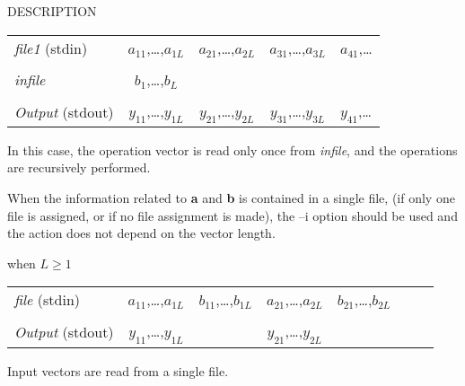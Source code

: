 \begin{qsection}{DESCRIPTION}
\begin{description}
\begin{tabular}{l|c|c|c|l} \cline{2-5}
{\em file1} (stdin)     & {$a_{11}$,\dots,$a_{1L}$}
                        & {$a_{21}$,\dots,$a_{2L}$}
                        & {$a_{31}$,\dots,$a_{3L}$}
                        & {$a_{41}$,\dots} \\ \cline{2-5}
\multicolumn{5}{c}{}    \\[-10pt]
                        \cline{2-2}
{\em infile}            & {$b_{1}$,\dots,$b_{L}$}
                        & \multicolumn{3}{c}{} \\ \cline{2-2}
\multicolumn{5}{c}{}    \\[-10pt]
                        \cline{2-5}                     
{\em Output} (stdout)   & {$y_{11}$,\dots,$y_{1L}$}
                        & {$y_{21}$,\dots,$y_{2L}$}
                        & {$y_{31}$,\dots,$y_{3L}$}
                        & {$y_{41}$,\dots} \\ \cline{2-5}
\end{tabular}
\par
In this case, the operation vector is read only once from
{\em infile}, and the operations are recursively performed.
\end{description}
\par
When the information related to {\bf a} and {\bf b} is contained
in a single file,
(if only one file is assigned,
or if no file assignment is made),
the --i option should be used
and the action does not depend on the vector length.
\begin{description}
\item{when $L\geq 1$}~\\
\begin{tabular}{l|c|c|c|c|l} \cline{2-6}
{\em file} (stdin)      & {$a_{11}$,\dots,$a_{1L}$}
                        & {$b_{11}$,\dots,$b_{1L}$}
                        & {$a_{21}$,\dots,$a_{2L}$}
                        & {$b_{21}$,\dots,$b_{2L}$}
                        & ~~~ \\ \cline{2-6}
\multicolumn{6}{c}{}    \\[-10pt]
                        \cline{2-2} \cline{4-4} \cline{6-6}
{\em Output} (stdout)   & {$y_{11}$,\dots,$y_{1L}$} &
                        & {$y_{21}$,\dots,$y_{2L}$} &
                        & ~~~ \\
                        \cline{2-2} \cline{4-4} \cline{6-6}
\end{tabular}
\par
Input vectors are read from a single file.
\end{description}
\end{qsection}

